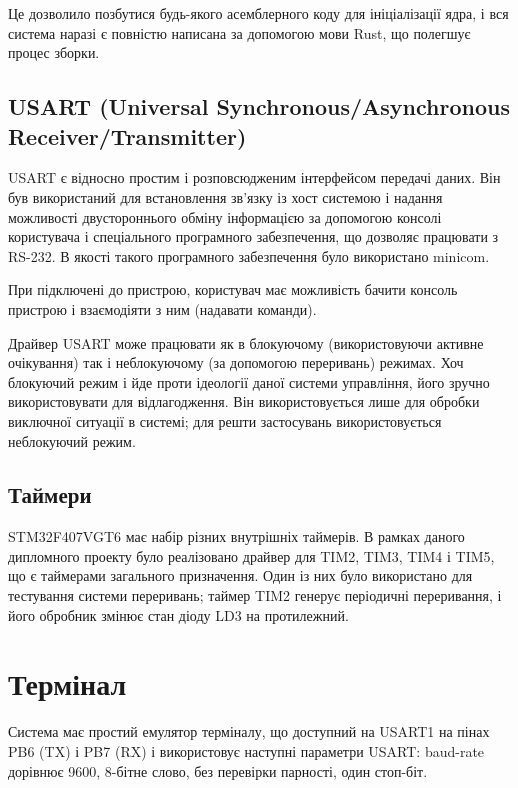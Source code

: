 \documentclass[oneside,14pt,a4paper,final]{myextreport}
\begin{document}
Це дозволило позбутися будь-якого асемблерного коду для ініціалізації ядра, і вся система наразі є повністю написана за допомогою мови Rust, що полегшує процес зборки.

\subsection{USART (Universal Synchronous\slash{}\hspace{0pt}Asynchronous Receiver\slash{}\hspace{0pt}Transmitter)}

  USART є відносно простим і розповсюдженим інтерфейсом передачі даних. Він був використаний для встановлення зв'язку із хост системою і надання можливості двустороннього обміну інформацією за допомогою консолі користувача і спеціального програмного забезпечення, що дозволяє працювати з RS-232. В якості такого програмного забезпечення було використано minicom.

  При підключені до пристрою, користувач має можливість бачити консоль пристрою і взаємодіяти з ним (надавати команди).

  Драйвер USART може працювати як в блокуючому (використовуючи активне очікування) так і неблокуючому (за допомогою переривань) режимах. Хоч блокуючий режим і йде проти ідеології даної системи управління, його зручно використовувати для відлагодження. Він використовується лише для обробки виключної ситуації в системі; для решти застосувань використовується неблокуючий режим.

\subsection{Таймери}

STM32F407VGT6 має набір різних внутрішніх таймерів. В рамках даного дипломного проекту було реалізовано драйвер для TIM2, TIM3, TIM4 і TIM5, що є таймерами загального призначення. Один із них було використано для тестування системи переривань; таймер TIM2 генерує періодичні переривання, і його обробник змінює стан діоду LD3 на протилежний.

\section{Термінал}

Система має простий емулятор терміналу, що доступний на USART1 на пінах PB6 (TX) і PB7 (RX) і використовує наступні параметри USART: baud-rate дорівнює 9600, 8-бітне слово, без перевірки парності, один стоп-біт.
\end{document}

